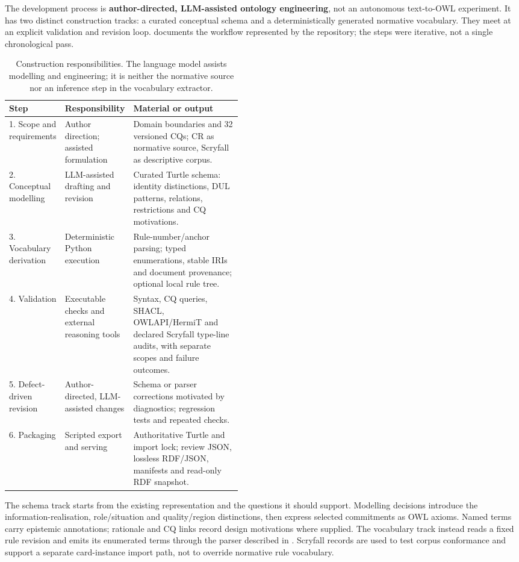\documentclass[11pt,a4paper]{article}
\begin{document}
The development process is \textbf{author-directed, LLM-assisted ontology engineering}, not an autonomous text-to-OWL experiment. It has two distinct construction tracks: a curated conceptual schema and a deterministically generated normative vocabulary. They meet at an explicit validation and revision loop.  documents the workflow represented by the repository; the steps were iterative, not a single chronological pass.

\begin{table}[t]
\centering
\small
\setlength{\tabcolsep}{4pt}
\begin{tabularx}{\linewidth}{@{}p{0.20\linewidth}p{0.25\linewidth}X@{}}
\toprule
\textbf{Step} & \textbf{Responsibility} & \textbf{Material or output} \\
\midrule
1. Scope and requirements & Author direction; assisted formulation & Domain boundaries and 32 versioned CQs; CR as normative source, Scryfall as descriptive corpus. \\
2. Conceptual modelling & LLM-assisted drafting and revision & Curated Turtle schema: identity distinctions, DUL patterns, relations, restrictions and CQ motivations. \\
3. Vocabulary derivation & Deterministic Python execution & Rule-number/anchor parsing; typed enumerations, stable IRIs and document provenance; optional local rule tree. \\
4. Validation & Executable checks and external reasoning tools & Syntax, CQ queries, SHACL, OWLAPI/HermiT and declared Scryfall type-line audits, with separate scopes and failure outcomes. \\
5. Defect-driven revision & Author-directed, LLM-assisted changes & Schema or parser corrections motivated by diagnostics; regression tests and repeated checks. \\
6. Packaging & Scripted export and serving & Authoritative Turtle and import lock; review JSON, lossless RDF/JSON, manifests and read-only RDF snapshot. \\
\bottomrule
\end{tabularx}
\caption{Construction responsibilities. The language model assists modelling and engineering; it is neither the normative source nor an inference step in the vocabulary extractor.}
\label{tab:construction}
\end{table}

The schema track starts from the existing representation and the questions it should support. Modelling decisions introduce the information-realisation, role/situation and quality/region distinctions, then express selected commitments as OWL axioms. Named terms carry epistemic annotations; rationale and CQ links record design motivations where supplied. The vocabulary track instead reads a fixed rule revision and emits its enumerated terms through the parser described in . Scryfall records are used to test corpus conformance and support a separate card-instance import path, not to override normative rule vocabulary.
\end{document}
